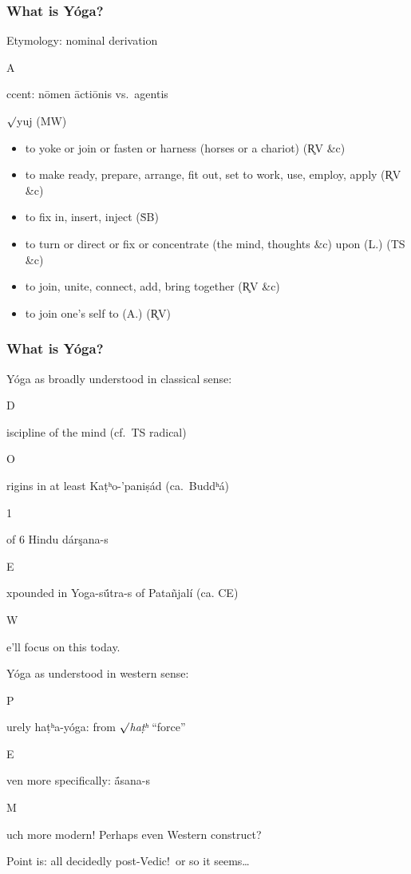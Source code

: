 \documentclass[pdf]{beamer}
\newcommand{\Subitem}[1]{{\setlength\itemindent{12pt} \item[-] #1}}
\newcommand{\Subsubitem}[1]{{\setlength\itemindent{24pt} \item[○] #1}}
\begin{document}
\begin{frame} \frametitle{What is Yóga?}
\begin{itemize}
	\item Etymology: nominal derivation
	\Subitem Accent: nōmen āctiōnis vs.~agentis
\end{itemize}

\begin{block} {$\surd$yuj (MW)}
\begin{itemize}
	\item to yoke or join or fasten or harness (horses or a chariot) (R̥V \&c)
	\item to make ready, prepare, arrange, fit out, set to work, use, employ, apply (R̥V \&c)
	\item to fix in, insert, inject (ṠB)
	\item to turn or direct or fix or concentrate (the mind, thoughts \&c) upon (L.) (TS \&c)
	\item to join, unite, connect, add, bring together (R̥V \&c)
	\item to join one's self to (A.) (R̥V)
\end{itemize}
\end{block}
\end{frame}

\begin{frame} \frametitle{What is Yóga?}
\begin{itemize}
	\item Yóga as broadly understood in classical sense:
	\Subitem Discipline of the mind (cf.~TS radical)
	\Subitem Origins in at least Kaṭʰo-'paniṣád (ca.~Buddʰá)
	\Subitem 1 of 6 Hindu dárşana-s
	\Subitem Expounded in Yoga-sū́tra-s of Patañjalí (ca. CE)
	\Subitem We'll focus on this today.
	\pause \item Yóga as understood in western sense:
	\Subitem Purely haṭʰa-yóga: from $\surd$\textit{haṭʰ} ``force''
	\Subsubitem Even more specifically: ā́sana-s
	\Subitem Much more modern! Perhaps even Western construct?
	\pause \item Point is: all decidedly post-Vedic!~or so it seems\ldots
\end{itemize}
\end{frame}
\end{document}
